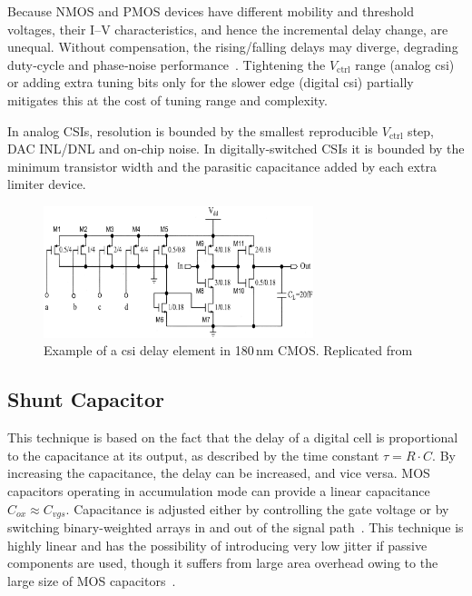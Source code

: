 Because NMOS and PMOS devices have different mobility and threshold voltages, their I--V characteristics, and hence the incremental delay change, are unequal.  Without compensation, the rising/falling delays may diverge, degrading duty‑cycle and phase‑noise performance~\cite{Heck2015optimization}.  Tightening the $V_{\mathrm{ctrl}}$ range (analog \gls{csi}) or adding extra tuning bits only for the slower edge (digital \gls{csi}) partially mitigates this at the cost of tuning range and complexity.

In analog CSIs, resolution is bounded by the smallest reproducible $V_{\mathrm{ctrl}}$ step, DAC INL/DNL and on‑chip noise.  In digitally‑switched CSIs it is bounded by the minimum transistor width and the parasitic capacitance added by each extra limiter device.


\begin{figure}[hb]
    \centering
    \includegraphics[width=0.7\textwidth]{figures/Schematics/CSI_delay_example.png}
    \caption{Example of a \gls{csi} delay element in 180\,nm CMOS. Replicated from~\protect\cite{maymandi2003digitally}}\label{fig:csi_delay_eg}
\end{figure}

\subsection{Shunt Capacitor}
This technique is based on the fact that the delay of a digital cell is proportional to the capacitance at its output, as described by the time constant $ \tau = R \cdot C $. By increasing the capacitance, the delay can be increased, and vice versa.
MOS capacitors operating in accumulation mode can provide a linear capacitance $C_{ox}\approx C_{vgs}$. Capacitance is adjusted either by controlling the gate voltage or by switching binary-weighted arrays in and out of the signal path~\cite{andreani1998shunt}.
This technique is highly linear and has the possibility of introducing very low jitter if passive components are used, though it suffers from large area overhead owing to the large size of MOS capacitors~\cite{pao2005portable}.

